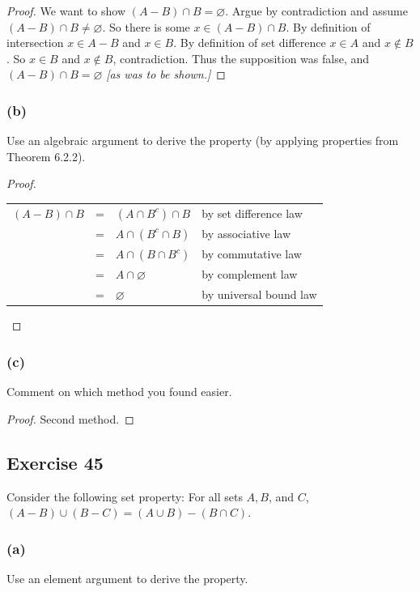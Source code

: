 \documentclass[14pt]{extarticle}
\newcommand{\es}{\varnothing}
\newcommand{\cy}{\color{cyan}}
\begin{document}
\begin{proof}
We want to show \((A - B) \cap B = \es\). Argue by contradiction and assume \((A - B) \cap B \neq \es\).
So there is some \(x \in (A - B) \cap B\). By definition of intersection \(x \in A-B\) and \(x \in B\). By definition
of set difference \(x \in A\) and \(x \notin B\). So \(x \in B\) and \(x \notin B\), contradiction. Thus the 
supposition was false, and \((A - B) \cap B = \es\) {\it [as was to be shown.]}
\end{proof}

\subsubsection{(b)}
Use an algebraic argument to derive the property (by applying properties from Theorem 6.2.2).

\begin{proof}
\begin{center}
\begin{tabular}{rcll}
\((A - B) \cap B\) & = & \((A \cap B^c) \cap B\) & {\cy by set difference law} \\
& = & \(A \cap (B^c \cap B)\) & {\cy by associative law} \\
& = & \(A \cap (B \cap B^c)\) & {\cy by commutative law} \\
& = & \(A \cap \es\) & {\cy by complement law} \\
& = & \(\es\) & {\cy by universal bound law}
\end{tabular}
\end{center}
\end{proof}

\subsubsection{(c)}
Comment on which method you found easier.

\begin{proof}
Second method.
\end{proof}

\subsection{Exercise 45}
Consider the following set property: For all sets $A, B$, and $C$, \((A - B) \cup (B - C) = (A \cup B) - (B \cap C)\).

\subsubsection{(a)}
Use an element argument to derive the property.
\end{document}
